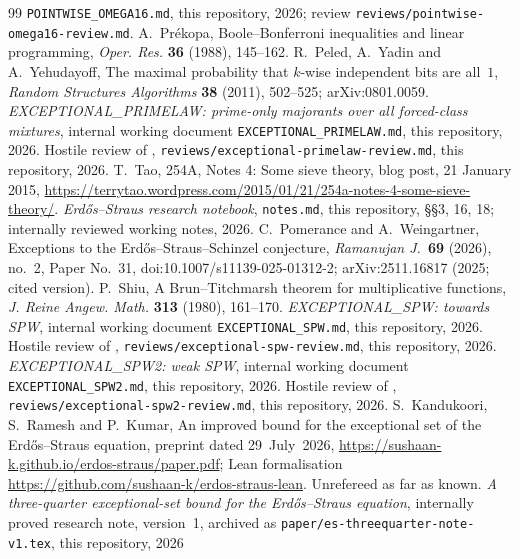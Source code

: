 \documentclass[10pt,reqno]{amsart}
\theoremstyle{definition}
\theoremstyle{remark}
\begin{document}
\begin{thebibliography}{99}
\texttt{POINTWISE\_OMEGA16.md}, this repository, 2026; review
\texttt{reviews/pointwise-omega16-review.md}.
A.~Pr\'ekopa, Boole--Bonferroni inequalities and linear programming,
\emph{Oper. Res.} \textbf{36} (1988), 145--162.
R.~Peled, A.~Yadin and A.~Yehudayoff, The maximal probability that $k$-wise
independent bits are all~$1$, \emph{Random Structures Algorithms}
\textbf{38} (2011), 502--525; arXiv:0801.0059.
\emph{EXCEPTIONAL\_PRIMELAW: prime-only majorants over all forced-class
mixtures}, internal working document \texttt{EXCEPTIONAL\_PRIMELAW.md},
this repository, 2026.
Hostile review of \cite{PL}, \texttt{reviews/exceptional-primelaw-review.md},
this repository, 2026.
T.~Tao, 254A, Notes 4: Some sieve theory, blog post, 21 January 2015,
\url{https://terrytao.wordpress.com/2015/01/21/254a-notes-4-some-sieve-theory/}.
\emph{Erd\H{o}s--Straus research notebook}, \texttt{notes.md}, this
repository, \S\S3, 16, 18; internally reviewed working notes, 2026.
C.~Pomerance and A.~Weingartner, Exceptions to the
Erd\H{o}s--Straus--Schinzel conjecture, \emph{Ramanujan J.}\ \textbf{69} (2026), no.~2, Paper No.~31,
doi:10.1007/s11139-025-01312-2; arXiv:2511.16817 (2025;
cited version).
P.~Shiu, A Brun--Titchmarsh theorem for multiplicative functions,
\emph{J. Reine Angew. Math.} \textbf{313} (1980), 161--170.
\emph{EXCEPTIONAL\_SPW: towards SPW}, internal working document
\texttt{EXCEPTIONAL\_SPW.md}, this repository, 2026.
Hostile review of \cite{SPW}, \texttt{reviews/exceptional-spw-review.md},
this repository, 2026.
\emph{EXCEPTIONAL\_SPW2: weak SPW}, internal working document
\texttt{EXCEPTIONAL\_SPW2.md}, this repository, 2026.
Hostile review of \cite{SPW2}, \texttt{reviews/exceptional-spw2-review.md},
this repository, 2026.
S.~Kandukoori, S.~Ramesh and P.~Kumar, An improved bound for the
exceptional set of the Erd\H{o}s--Straus equation, preprint dated
29~July~2026, \url{https://sushaan-k.github.io/erdos-straus/paper.pdf};
Lean formalisation \url{https://github.com/sushaan-k/erdos-straus-lean}.
Unrefereed as far as known.
\emph{A three-quarter exceptional-set bound for the Erd\H{o}s--Straus
equation}, internally proved research note, version~1, archived as
\texttt{paper/es-threequarter-note-v1.tex}, this repository, 2026

\end{thebibliography}
\end{document}
